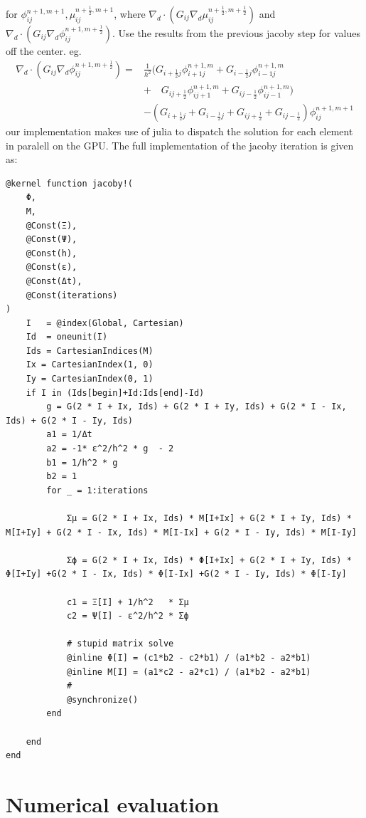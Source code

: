 \documentclass{mimosis}
\begin{document}
for \(\phi_{ij}^{n+1,m+1} , \mu_{ij}^{n+\frac{1}{2},m+1}\),
where \(\nabla _d \cdot (G_{ij} \nabla_d \mu_{ij}^{n+\frac{1}{2},m+\frac{1}{2}} )\) and \(\nabla_d \cdot  (G_{ij} \nabla _d \phi_{ij}^{n+1,m+\frac{1}{2}} )\).  Use the results from the previous jacoby step for values off the center. eg.
\begin{equation}
\begin{aligned}
 \nabla _d \cdot (G_{ij} \nabla_d \phi_{ij}^{n+1,m+\frac{1}{2}} )  =&
\frac{1}{h^2} (
G_{i+\frac{1}{2}j}\phi_{i+1j}^{n+1,m}
+ G_{i-\frac{1}{2}j}\phi_{i-1j}^{n+1,m} \\
& + \quad G_{ij+\frac{1}{2}}\phi_{ij+1}^{n+1,m}
+ G_{ij-\frac{1}{2}}\phi_{ij-1}^{n+1,m}
 ) \\
& -
\left(
 G_{i+\frac{1}{2}j}
 + G_{i-\frac{1}{2}j}
 + G_{ij+\frac{1}{2}}
 + G_{ij-\frac{1}{2}}
\right)\phi_{ij}^{n+1,m+1}
\end{aligned}
\end{equation}
our implementation makes use of julia to dispatch the solution for each element in paralell on the GPU. The full implementation of the jacoby iteration is given as:
\begin{verbatim}
@kernel function jacoby!(
    Φ,
    M,
    @Const(Ξ),
    @Const(Ψ),
    @Const(h),
    @Const(ε),
    @Const(Δt),
    @Const(iterations)
)
    I   = @index(Global, Cartesian)
    Id  = oneunit(I)
    Ids = CartesianIndices(M)
    Ix = CartesianIndex(1, 0)
    Iy = CartesianIndex(0, 1)
    if I in (Ids[begin]+Id:Ids[end]-Id)
        g = G(2 * I + Ix, Ids) + G(2 * I + Iy, Ids) + G(2 * I - Ix, Ids) + G(2 * I - Iy, Ids)
        a1 = 1/Δt
        a2 = -1* ε^2/h^2 * g  - 2
        b1 = 1/h^2 * g
        b2 = 1
        for _ = 1:iterations

            Σμ = G(2 * I + Ix, Ids) * M[I+Ix] + G(2 * I + Iy, Ids) * M[I+Iy] + G(2 * I - Ix, Ids) * M[I-Ix] + G(2 * I - Iy, Ids) * M[I-Iy]

            Σϕ = G(2 * I + Ix, Ids) * Φ[I+Ix] + G(2 * I + Iy, Ids) * Φ[I+Iy] +G(2 * I - Ix, Ids) * Φ[I-Ix] +G(2 * I - Iy, Ids) * Φ[I-Iy]

            c1 = Ξ[I] + 1/h^2   * Σμ
            c2 = Ψ[I] - ε^2/h^2 * Σϕ

            # stupid matrix solve
            @inline Φ[I] = (c1*b2 - c2*b1) / (a1*b2 - a2*b1)
            @inline M[I] = (a1*c2 - a2*c1) / (a1*b2 - a2*b1)
            #
            @synchronize()
        end

    end
end
\end{verbatim}
\chapter{Numerical evaluation}
\label{sec:orgb19866a}
\end{document}

